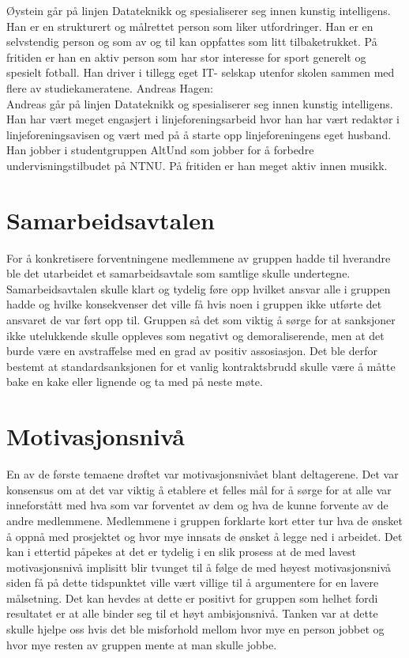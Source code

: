 \documentclass[a4paper,norsk,oneside]{article}
\begin{document}
Øystein går på linjen Datateknikk og spesialiserer seg innen kunstig intelligens. Han er en strukturert og målrettet person som liker utfordringer. Han er en selvstendig person og som av og til kan oppfattes som litt tilbaketrukket. På fritiden er han en aktiv person som har stor interesse for sport generelt og spesielt fotball. Han driver i tillegg eget IT- selskap utenfor skolen sammen med flere av studiekameratene.
\newline
\newline
Andreas Hagen:\\
Andreas går på linjen Datateknikk og spesialiserer seg innen kunstig intelligens. Han har vært meget engasjert i linjeforeningsarbeid hvor han har vært redaktør i linjeforeningsavisen og vært med på å starte opp linjeforeningens eget husband. Han jobber i studentgruppen AltUnd som jobber for å forbedre undervisningstilbudet på NTNU. På fritiden er han meget aktiv innen musikk.


\section{Samarbeidsavtalen}
For å konkretisere forventningene medlemmene av gruppen hadde til hverandre ble det utarbeidet et samarbeidsavtale som samtlige skulle undertegne. Samarbeidsavtalen skulle klart og tydelig føre opp hvilket ansvar alle i gruppen hadde og hvilke konsekvenser det ville få hvis noen i gruppen ikke utførte det ansvaret de var ført opp til. Gruppen så det som viktig å sørge for at sanksjoner ikke utelukkende skulle oppleves som negativt og demoraliserende, men at det burde være en avstraffelse med en grad av positiv assosiasjon. Det ble derfor bestemt at standardsanksjonen for et vanlig kontraktsbrudd skulle være å måtte bake en kake eller lignende og ta med på neste møte.

\section{Motivasjonsnivå}
En av de første temaene drøftet var motivasjonsnivået blant deltagerene. Det var konsensus om at det var viktig å etablere et felles mål for å sørge for at alle var inneforstått med hva som var forventet av dem og hva de kunne forvente av de andre medlemmene. Medlemmene i gruppen forklarte kort etter tur hva de ønsket å oppnå med prosjektet og hvor mye innsats de ønsket å legge ned i arbeidet. Det kan i ettertid påpekes at det er tydelig i en slik prosess at de med lavest motivasjonsnivå implisitt blir tvunget til å følge de med høyest motivasjonsnivå siden få på dette tidspunktet ville vært villige til å argumentere for en lavere målsetning. Det kan hevdes at dette er positivt for gruppen som helhet fordi resultatet er at alle binder seg til et høyt ambisjonsnivå. Tanken var at dette skulle hjelpe oss hvis det ble misforhold mellom hvor mye en person jobbet og hvor mye resten av gruppen mente at man skulle jobbe.
	
\end{document}
